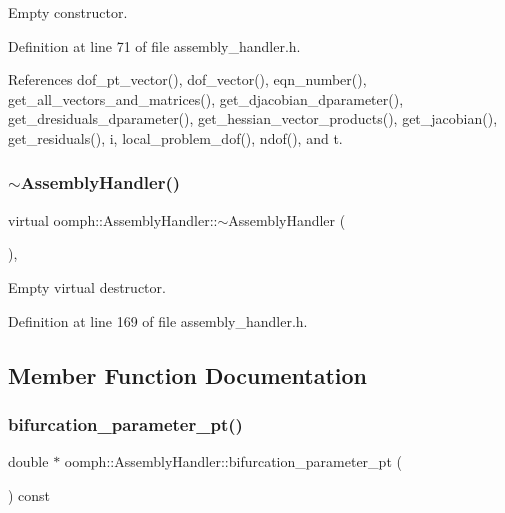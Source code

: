 Empty constructor. 



Definition at line 71 of file assembly\+\_\+handler.\+h.



References dof\+\_\+pt\+\_\+vector(), dof\+\_\+vector(), eqn\+\_\+number(), get\+\_\+all\+\_\+vectors\+\_\+and\+\_\+matrices(), get\+\_\+djacobian\+\_\+dparameter(), get\+\_\+dresiduals\+\_\+dparameter(), get\+\_\+hessian\+\_\+vector\+\_\+products(), get\+\_\+jacobian(), get\+\_\+residuals(), i, local\+\_\+problem\+\_\+dof(), ndof(), and t.

\mbox{\label{classoomph_1_1AssemblyHandler_ab26633238200230ab57a20cc49e731de}} 
\subsubsection{\texorpdfstring{$\sim$\+Assembly\+Handler()}{~AssemblyHandler()}}
{\footnotesize\ttfamily virtual oomph\+::\+Assembly\+Handler\+::$\sim$\+Assembly\+Handler (\begin{DoxyParamCaption}{ }\end{DoxyParamCaption})\hspace{0.3cm}{\ttfamily [inline]}, {\ttfamily [virtual]}}



Empty virtual destructor. 



Definition at line 169 of file assembly\+\_\+handler.\+h.



\subsection{Member Function Documentation}
\mbox{\label{classoomph_1_1AssemblyHandler_a3e369ec692c3d36a4a2a8a64dab7fe2b}} 
\subsubsection{\texorpdfstring{bifurcation\+\_\+parameter\+\_\+pt()}{bifurcation\_parameter\_pt()}}
{\footnotesize\ttfamily double $\ast$ oomph\+::\+Assembly\+Handler\+::bifurcation\+\_\+parameter\+\_\+pt (\begin{DoxyParamCaption}{ }\end{DoxyParamCaption}) const\hspace{0.3cm}{\ttfamily [virtual]}}



